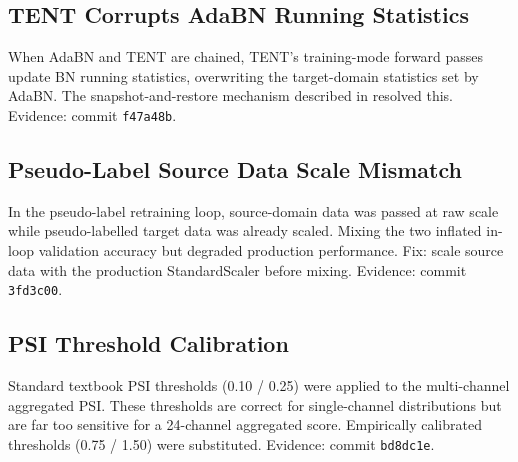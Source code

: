 \subsection{TENT Corrupts AdaBN Running Statistics}

When AdaBN and TENT are chained, TENT's training-mode forward passes update
BN running statistics, overwriting the target-domain statistics set by AdaBN.
The snapshot-and-restore mechanism described in 
resolved this.
Evidence: commit \texttt{f47a48b}.

\subsection{Pseudo-Label Source Data Scale Mismatch}

In the pseudo-label retraining loop, source-domain data was passed at raw scale
while pseudo-labelled target data was already scaled.
Mixing the two inflated in-loop validation accuracy but degraded production
performance.
Fix: scale source data with the production StandardScaler before mixing.
Evidence: commit \texttt{3fd3c00}.

\subsection{PSI Threshold Calibration}

Standard textbook PSI thresholds (0.10 / 0.25) were applied to the multi-channel
aggregated PSI.
These thresholds are correct for single-channel distributions but are far too
sensitive for a 24-channel aggregated score.
Empirically calibrated thresholds (0.75 / 1.50) were substituted.
Evidence: commit \texttt{bd8dc1e}.

